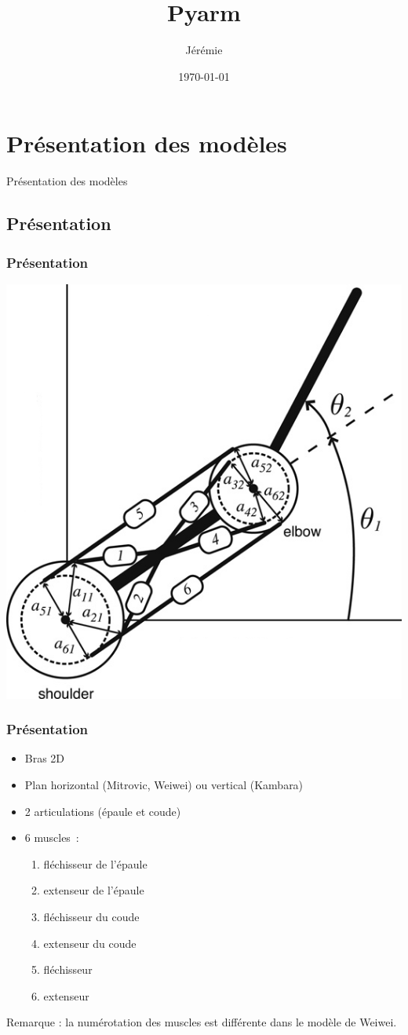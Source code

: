 \documentclass{beamer}
\title{Pyarm}
\author{Jérémie \bsc{Decock}}
\institute{ISIR}
\date{\today{}}
\begin{document}
\begin{frame}
\titlepage
\end{frame}


\section{Présentation des modèles}
\begin{frame}
\begin{center}
{\LARGE Présentation des modèles}
\end{center}
\end{frame}


\subsection{Présentation}

\begin{frame}
\frametitle{Présentation}
\begin{center}
        \includegraphics[width=.40\linewidth]{fig/arm}
\end{center}
\end{frame}

\begin{frame}
\frametitle{Présentation}
\begin{itemize}
    \item Bras 2D
    \item Plan horizontal (Mitrovic, Weiwei) ou vertical (Kambara)
    \item 2 articulations (épaule et coude)
    \item 6 muscles~:
    \begin{enumerate}
        \item fléchisseur de l'épaule
        \item extenseur de l'épaule
        \item fléchisseur du coude
        \item extenseur du coude
        \item fléchisseur
        \item extenseur
    \end{enumerate}
\end{itemize}
Remarque : la numérotation des muscles est différente dans le modèle de Weiwei.
\end{frame}
\end{document}
